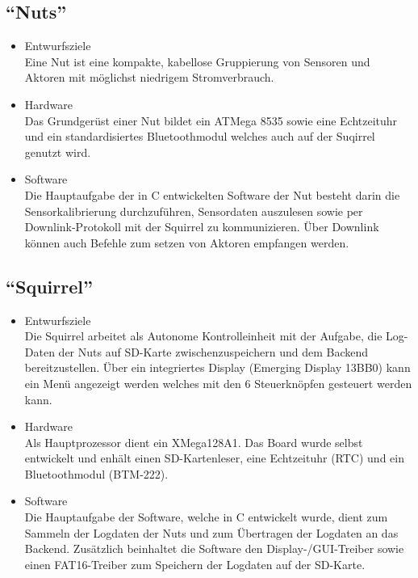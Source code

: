 \documentclass[12pt,a4paper]{article}
\begin{document}
\subsection{``Nuts''}
\begin{itemize}
	\item Entwurfsziele\\
	Eine Nut ist eine kompakte, kabellose Gruppierung von Sensoren und Aktoren mit möglichst niedrigem Stromverbrauch.
	\item Hardware\\
	Das Grundgerüst einer Nut bildet ein ATMega 8535 sowie eine Echtzeituhr und ein standardisiertes Bluetoothmodul welches auch auf der Suqirrel genutzt wird.
	\item Software\\
	Die Hauptaufgabe der in C entwickelten Software der Nut besteht darin die Sensorkalibrierung durchzuführen, Sensordaten auszulesen sowie per Downlink-Protokoll mit der Squirrel zu kommunizieren. Über Downlink können auch Befehle zum setzen von Aktoren empfangen werden.
\end{itemize}
\subsection{``Squirrel''}
\begin{itemize}
	\item Entwurfsziele\\
	Die Squirrel arbeitet als Autonome Kontrolleinheit mit der Aufgabe, die Log-Daten der Nuts auf SD-Karte zwischenzuspeichern und dem Backend bereitzustellen. Über ein integriertes Display (Emerging Display 13BB0) kann ein Menü angezeigt werden welches mit den 6 Steuerknöpfen gesteuert werden kann.
	\item Hardware\\
	Als Hauptprozessor dient ein XMega128A1. Das Board wurde selbst entwickelt und enhält einen SD-Kartenleser, eine Echtzeituhr (RTC) und ein Bluetoothmodul (BTM-222).
	\item Software\\
	Die Hauptaufgabe der Software, welche in C entwickelt wurde, dient zum Sammeln der Logdaten der Nuts und zum Übertragen der Logdaten an das Backend. Zusätzlich beinhaltet die Software den Display-/GUI-Treiber sowie einen FAT16-Treiber zum Speichern der Logdaten auf der SD-Karte.
\end{itemize}
\end{document}

